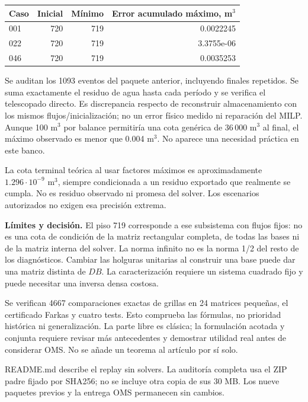 \documentclass[11pt,a4paper]{article}
\begin{document}
\begin{center}\begin{tabular}{lrrr}\toprule
Caso & Inicial & Mínimo & Error acumulado máximo, m$^3$\\\midrule
001 & 720 & 719 & 0.0022245 \\
022 & 720 & 719 & 3.3755e-06 \\
046 & 720 & 719 & 0.0035253 \\
\bottomrule\end{tabular}\end{center}

Se auditan los 1093 eventos del paquete anterior, incluyendo finales repetidos.
Se suma exactamente el residuo de agua hasta cada período y se verifica el
telescopado directo. Es discrepancia respecto de reconstruir almacenamiento
con los mismos flujos/inicialización; no un error físico medido ni reparación
del MILP. Aunque 100 m$^3$ por balance permitiría una cota genérica de 36\,000
m$^3$ al final, el máximo observado es menor que 0.004 m$^3$. No aparece una
necesidad práctica en este banco.

La cota terminal teórica al usar factores máximos es aproximadamente
$1.296\cdot10^{-9}$ m$^3$, siempre condicionada a un residuo exportado que
realmente se cumpla. No es residuo observado ni promesa del solver. Los
escenarios autorizados no exigen esa precisión extrema.

\textbf{Límites y decisión.} El piso 719 corresponde a ese subsistema con flujos
fijos: no es una cota de condición de la matriz rectangular completa, de todas
las bases ni de la matriz interna del solver. La norma infinito no es la norma
1/2 del resto de los diagnósticos. Cambiar las holguras unitarias al construir
una base puede dar una matriz distinta de $DB$. La caracterización requiere
un sistema cuadrado fijo y puede necesitar una inversa densa costosa.

Se verifican 4667 comparaciones exactas de grillas en 24 matrices pequeñas,
el certificado Farkas y cuatro tests. Esto comprueba las fórmulas, no prioridad
histórica ni generalización. La parte libre es clásica; la formulación acotada
y conjunta requiere revisar más antecedentes y demostrar utilidad real antes
de considerar OMS. No se añade un teorema al artículo por sí solo.

README.md describe el replay sin solvers. La auditoría completa usa el ZIP padre
fijado por SHA256; no se incluye otra copia de sus 30 MB. Los nueve paquetes
previos y la entrega OMS permanecen sin cambios.
\end{document}

